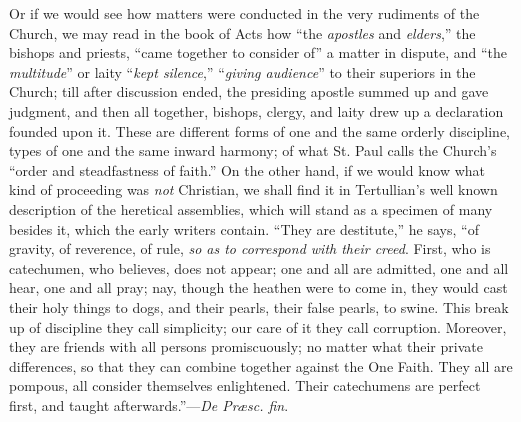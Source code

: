 Or if we
would see how matters were conducted in the very rudiments of the
Church, we may read in the book of Acts how ``the \emph{apostles} and \emph{elders},''
the bishops and priests, ``came together to consider of'' a matter in
dispute, and ``the \emph{multitude}'' or laity ``\emph{kept silence},'' ``\emph{giving audience}'' to their superiors in the Church; till
after discussion ended, the presiding apostle summed up and gave
judgment, and then all together, bishops, clergy, and laity drew up a
declaration founded upon it. These are different forms of one and the
same orderly discipline, types of one and the same inward harmony; of
what St. Paul calls the Church's ``order and steadfastness of
faith.'' On the other hand, if we would know what kind of proceeding
was \emph{not} Christian, we shall find it in Tertullian's well known
description of the heretical assemblies, which will stand as a specimen
of many besides it, which the early writers contain. ``They are
destitute,'' he says, ``of gravity, of reverence, of rule, \emph{so as to
correspond with their creed}. First, who is catechumen, who believes,
does not appear; one and all are admitted, one and all hear, one and all
pray; nay, though the heathen were to come in, they would cast their
holy things to dogs, and their pearls, their false pearls, to swine.
This break up of
discipline they call simplicity; our care of it they call corruption.
Moreover, they are friends with all persons promiscuously; no matter
what their private differences, so that they can combine together
against the One Faith. They all are pompous, all consider themselves
enlightened. Their catechumens are perfect first, and taught
afterwards.''—\emph{De Præsc. fin}.

